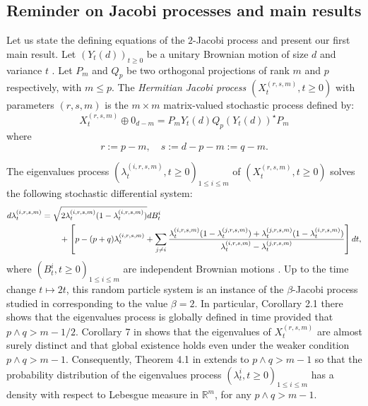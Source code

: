 \documentclass[12pt,reqno]{amsart}
\begin{document}
\subsection{Reminder on Jacobi processes and main results}
Let us state the defining equations of the $2$-Jacobi process and present our first main result. 
Let $(Y_t(d))_{t \geq 0}$ be a unitary Brownian motion of size $d$ and variance $t$ \cite{MR1430721}. Let
$P_m$ and $Q_p$ be two orthogonal projections of rank $m$ and $p$ respectively,  with $m \leq p$. The \emph{Hermitian Jacobi process} $(X_t^{(r,s,m)}, {t \geq 0})$ with parameters $(r,s,m)$ is the $m\times m$ matrix-valued stochastic process defined by:
\begin{equation}
\label{eqn:hermitianjacobi}
	X^{(r,s,m)}_t \oplus 0_{d-m} = P_mY_t(d)Q_p(Y_t(d))^\star P_m
\end{equation}
where
\begin{equation}
\label{eqn:parametersrsm}
	r:= p-m, \quad s := d-p-m:= q-m.
\end{equation}

\newcommand{\lambdapri}{\lambda_t^{(i,r,s,m)}}
\newcommand{\lambdaprj}{\lambda_t^{(j,r,s,m)}}

The eigenvalues process $(\lambda_t^{(i,r,s,m)}, t \geq 0)_{1 \leq i \leq m}$ of $(X^{(r,s,m)}_t, {t \geq 0})$ solves the following stochastic differential system:
\begin{align}\label{SDE}
	d\lambdapri &= \sqrt{2\lambdapri(1-\lambdapri)}dB_t^i \\ 
    &\hspace{0.75cm}+ \left[
		p-(p+q)\lambdapri + \sum_{j \neq i}\frac{\lambdapri(1-\lambdaprj) + \lambdaprj(1-\lambdapri)}{\lambdapri-\lambdaprj}\right] dt \nonumber,
\end{align}
where $(B_t^i, t \geq 0)_{1 \leq i \leq m}$ are independent Brownian motions \cite{MR3842169}. Up to the time change $t \mapsto 2t$, this random particle system is an instance of the $\beta$-Jacobi process studied in \cite{MR2384475} corresponding to the value $\beta = 2$. In particular, Corollary 2.1 there shows that the eigenvalues process is globally defined in time provided that $p \wedge q > m-1/2$. Corollary 7 in \cite{MR3296535} shows that the eigenvalues of $X^{(r,s,m)}_t$ are almost surely distinct and that global existence holds even under the weaker condition $p \wedge q > m-1$. Consequently, Theorem 4.1 in \cite{MR2384475} extends to $p \wedge q > m-1$ so that the probability distribution of the eigenvalues process $(\lambda_t^i, t \geq 0)_{1 \leq i \leq m}$ has a density with respect to Lebesgue measure in $\mathbb{R}^m$, for any $p \wedge q > m-1$. %
\end{document}
